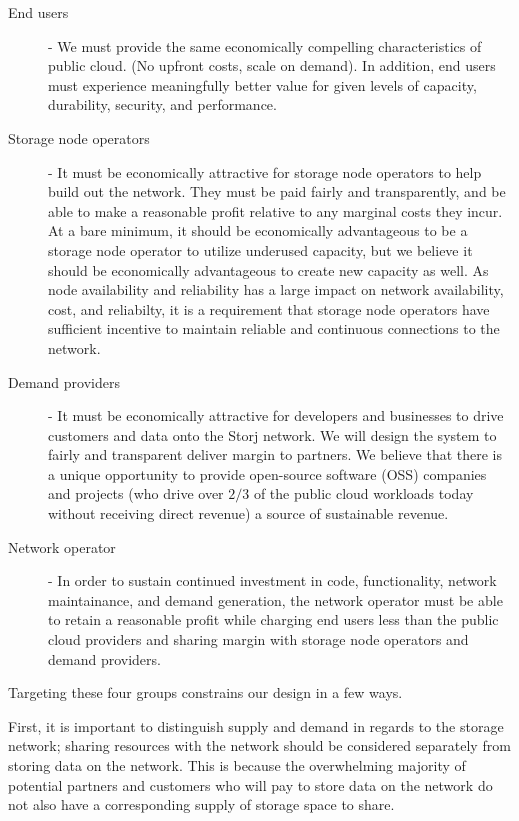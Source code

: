 \documentclass[11pt,fleqn,openany]{book}
\begin{document}
\begin{description}
\item[End users] - We must provide the same economically compelling
  characteristics of public cloud. (No upfront costs, scale on demand).
  In addition, end users must experience meaningfully better value for given
  levels of capacity, durability, security, and performance.

\item[Storage node operators] - It must be economically attractive for storage
  node operators to help build out the network.
  They must be paid fairly and transparently, and be able to make a
  reasonable profit relative to any marginal costs they incur.
  At a bare minimum, it should be economically advantageous to be a storage
  node operator to utilize underused capacity, but we believe it should be
  economically advantageous to create new capacity as well.
  As node availability and reliability has a large impact on network
  availability, cost, and reliabilty, it is a requirement that storage node
  operators have sufficient incentive to maintain reliable and continuous
  connections to the network.

\item[Demand providers] - It must be economically attractive for developers and
  businesses to drive customers and data onto the Storj network. We will design
  the system to fairly and transparent deliver margin to partners. We believe
  that there is a unique opportunity to provide open-source software (OSS)
  companies and projects (who drive over $2/3$ of the public cloud workloads
  today without receiving direct revenue) a source of sustainable revenue.

\item[Network operator] - In order to sustain continued investment in code,
  functionality, network maintainance, and demand generation, the network
  operator must be able to retain a reasonable profit while charging end
  users less than the public cloud providers and sharing margin with storage
  node operators and demand providers.
\end{description}

Targeting these four groups constrains our design in a few ways.

First, it is important to distinguish supply and demand in regards to the
storage network; sharing resources with the network should be considered
separately from storing data on the network. This is because
the overwhelming majority of potential partners and customers who will
pay to store data on the
network do not also have a corresponding supply of storage space to share.
\end{document}
